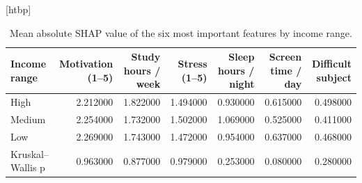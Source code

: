 \begin{table}
\small[htbp]
\caption{Mean absolute SHAP value of the six most important features by income range.}
\label{tab:A07b_shap_by_income}
\begin{tabular}{lrrrrrr}
\toprule
Income range & Motivation (1–5) & Study hours / week & Stress (1–5) & Sleep hours / night & Screen time / day & Difficult subject \\
\midrule
High & 2.212000 & 1.822000 & 1.494000 & 0.930000 & 0.615000 & 0.498000 \\
Medium & 2.254000 & 1.732000 & 1.502000 & 1.069000 & 0.525000 & 0.411000 \\
Low & 2.269000 & 1.743000 & 1.472000 & 0.954000 & 0.637000 & 0.468000 \\
Kruskal–Wallis p & 0.963000 & 0.877000 & 0.979000 & 0.253000 & 0.080000 & 0.280000 \\
\bottomrule
\end{tabular}
\end{table}
